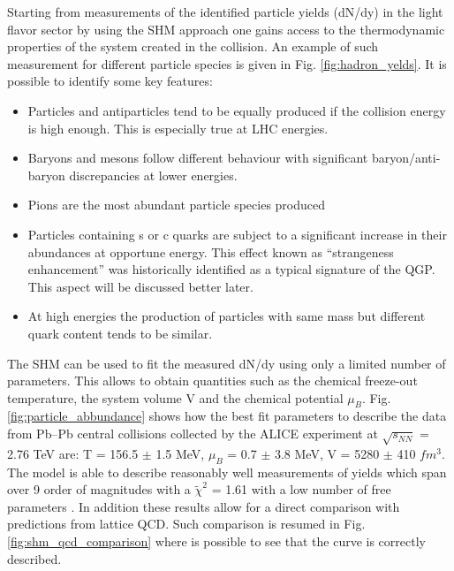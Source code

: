 \documentclass[12pt,a4paper]{book}
\begin{document}
	Starting from measurements of the identified particle yields (dN/dy) in the light flavor sector by using the SHM approach one gains access to the thermodynamic properties of the system created in the collision. An example of such measurement for different particle species is given in Fig. \ref{fig:hadron_yelds}. It is possible to identify some key features:
	\begin{itemize}
		\item  Particles and antiparticles tend to be equally produced if the collision energy is high enough. This is especially true at LHC energies.
		\item Baryons and mesons follow different behaviour with significant baryon/anti-baryon discrepancies at lower energies.
		\item  Pions are the most abundant particle species produced
		\item Particles containing s or c quarks are subject to a significant increase in their abundances at opportune energy. This effect known as “strangeness enhancement” was historically identified as a typical signature of the QGP. This aspect will be discussed better later.
		\item At high energies the production of particles with same mass but different quark content tends to be similar.
	\end{itemize}
	
	
	The SHM can be used to fit the measured dN/dy using only a limited number of parameters. This allows to obtain quantities such as the chemical freeze-out temperature, the system volume V and the chemical potential $\mu_B$. Fig. \ref{fig:particle_abbundance} shows how the best fit parameters to describe the data from Pb–Pb central collisions collected by the ALICE experiment at $\sqrt{s_{NN}}$ = 2.76 TeV are: T = 156.5 $\pm$ 1.5 MeV, $\mu_B$ = 0.7 $\pm$ 3.8 MeV, V = 5280 $\pm$ 410 $fm^3$. The model is able to describe reasonably well measurements of yields which span over 9 order of magnitudes with a $\tilde{\chi}^2$ = 1.61 with a low number of free parameters \cite{Andronic_2017}. In addition these results allow for a direct comparison with predictions from lattice QCD. Such comparison is resumed in Fig. \ref{fig:shm_qcd_comparison} where is possible to see that the curve is correctly described.
	
\end{document}
